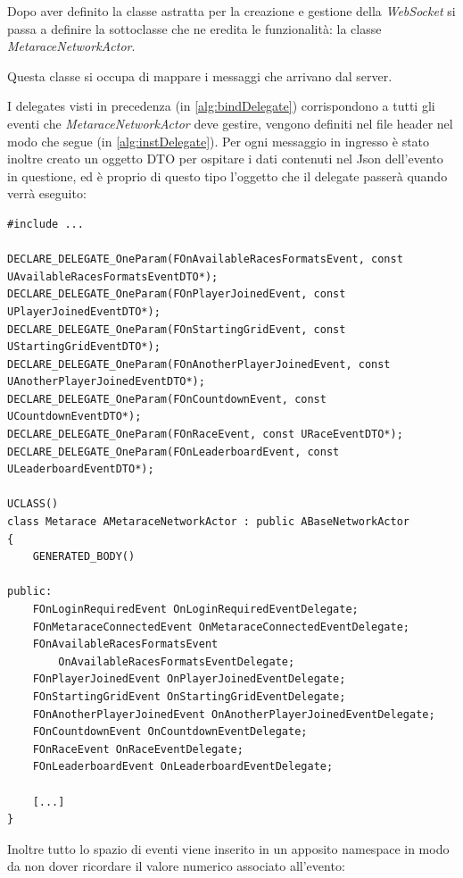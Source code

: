     Dopo aver definito la classe astratta per la creazione e gestione della \textit{WebSocket} si passa a definire la sottoclasse che ne eredita le funzionalità: la classe \textit{MetaraceNetworkActor}.

    Questa classe si occupa di mappare i messaggi che arrivano dal server.

    I delegates visti in precedenza (in \ref{alg:bindDelegate}) corrispondono a tutti gli eventi che \textit{MetaraceNetworkActor} deve gestire, vengono definiti nel file header nel modo che segue (in \ref{alg:instDelegate}). 
    Per ogni messaggio in ingresso è stato inoltre creato un oggetto DTO per ospitare i dati contenuti nel Json dell'evento in questione, ed è proprio di questo tipo l'oggetto che il delegate passerà quando verrà eseguito:

\label{alg:instDelegate}
\begin{lstlisting}[caption = Dichiarazione delegate nel file header di MetaraceNetworkActor]
#include ...

DECLARE_DELEGATE_OneParam(FOnAvailableRacesFormatsEvent, const UAvailableRacesFormatsEventDTO*);
DECLARE_DELEGATE_OneParam(FOnPlayerJoinedEvent, const UPlayerJoinedEventDTO*);
DECLARE_DELEGATE_OneParam(FOnStartingGridEvent, const UStartingGridEventDTO*);
DECLARE_DELEGATE_OneParam(FOnAnotherPlayerJoinedEvent, const UAnotherPlayerJoinedEventDTO*);
DECLARE_DELEGATE_OneParam(FOnCountdownEvent, const UCountdownEventDTO*);
DECLARE_DELEGATE_OneParam(FOnRaceEvent, const URaceEventDTO*);
DECLARE_DELEGATE_OneParam(FOnLeaderboardEvent, const ULeaderboardEventDTO*);

UCLASS()
class Metarace AMetaraceNetworkActor : public ABaseNetworkActor
{
    GENERATED_BODY()

public:
    FOnLoginRequiredEvent OnLoginRequiredEventDelegate;
    FOnMetaraceConnectedEvent OnMetaraceConnectedEventDelegate;
    FOnAvailableRacesFormatsEvent 
        OnAvailableRacesFormatsEventDelegate;
    FOnPlayerJoinedEvent OnPlayerJoinedEventDelegate;
    FOnStartingGridEvent OnStartingGridEventDelegate;
    FOnAnotherPlayerJoinedEvent OnAnotherPlayerJoinedEventDelegate;
    FOnCountdownEvent OnCountdownEventDelegate;
    FOnRaceEvent OnRaceEventDelegate;
    FOnLeaderboardEvent OnLeaderboardEventDelegate;

    [...]
}
\end{lstlisting}

    Inoltre tutto lo spazio di eventi viene inserito in un apposito namespace in modo da non dover ricordare il valore numerico associato all'evento:

